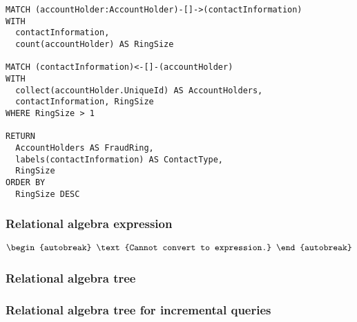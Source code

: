 \begin{lstlisting}
MATCH (accountHolder:AccountHolder)-[]->(contactInformation)
WITH
  contactInformation,
  count(accountHolder) AS RingSize

MATCH (contactInformation)<-[]-(accountHolder)
WITH
  collect(accountHolder.UniqueId) AS AccountHolders,
  contactInformation, RingSize
WHERE RingSize > 1

RETURN
  AccountHolders AS FraudRing,
  labels(contactInformation) AS ContactType,
  RingSize
ORDER BY
  RingSize DESC
\end{lstlisting}

\subsubsection*{Relational algebra expression}

\begin{align*}
\begin{autobreak}
\text{Cannot convert to expression.}
\end{autobreak}
\end{align*}

\subsubsection*{Relational algebra tree}


\subsubsection*{Relational algebra tree for incremental queries}

